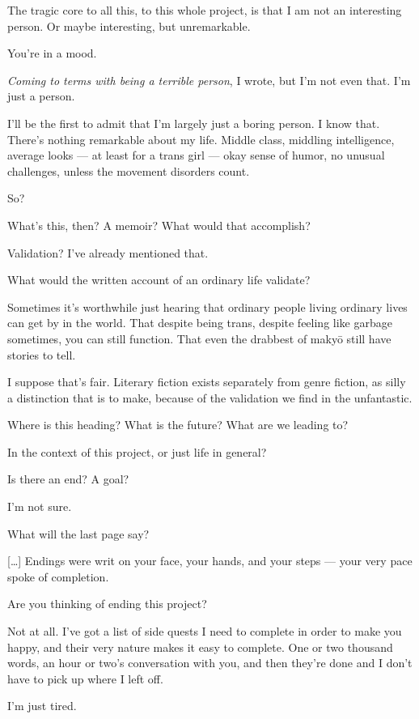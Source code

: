 The tragic core to all this, to this whole project, is that I am not an interesting person. Or maybe interesting, but unremarkable.

\begin{ally}
You're in a mood.
\end{ally}
\emph{Coming to terms with being a terrible person}, I wrote, but I'm not even that. I'm just a person.

I'll be the first to admit that I'm largely just a boring person. I know that. There's nothing remarkable about my life. Middle class, middling intelligence, average looks --- at least for a trans girl --- okay sense of humor, no unusual challenges, unless the movement disorders count.

\begin{ally}
So?
\end{ally}
What's this, then? A memoir? What would that accomplish?

\begin{ally}
Validation? I've already mentioned that.
\end{ally}
What would the written account of an ordinary life validate?

\begin{ally}
Sometimes it's worthwhile just hearing that ordinary people living ordinary lives can get by in the world. That despite being trans, despite feeling like garbage sometimes, you can still function. That even the drabbest of makyō still have stories to tell.
\end{ally}
I suppose that's fair. Literary fiction exists separately from genre fiction, as silly a distinction that is to make, because of the validation we find in the unfantastic.

\begin{ally}
Where is this heading? What is the future? What are we leading to?
\end{ally}
In the context of this project, or just life in general?

\begin{ally}
Is there an end? A goal?
\end{ally}
I'm not sure.

\begin{ally}
What will the last page say?
\end{ally}
{[}\ldots{}{]} Endings were writ on your face, your hands, and your steps --- your very pace spoke of completion.

\begin{ally}
Are you thinking of ending this project?
\end{ally}
Not at all. I've got a list of side quests I need to complete in order to make you happy, and their very nature makes it easy to complete. One or two thousand words, an hour or two's conversation with you, and then they're done and I don't have to pick up where I left off.

I'm just tired.
